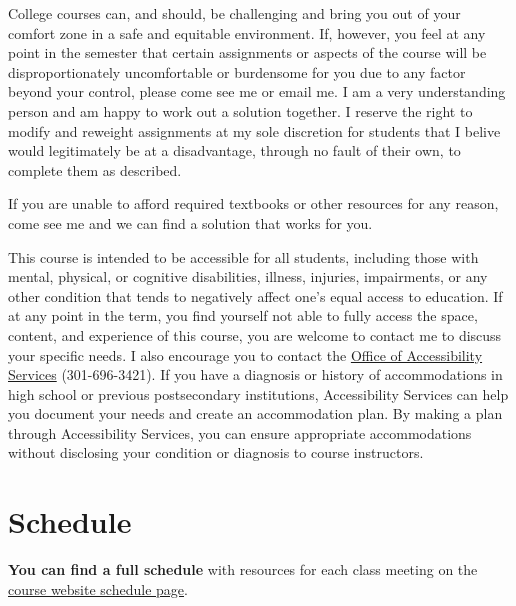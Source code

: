 \documentclass{article}
\begin{document}
College courses can, and should, be challenging and bring you out of
your comfort zone in a safe and equitable environment. If, however, you
feel at any point in the semester that certain assignments or aspects of
the course will be disproportionately uncomfortable or burdensome for
you due to any factor beyond your control, please come see me or email
me. I am a very understanding person and am happy to work out a solution
together. I reserve the right to modify and reweight assignments at my
sole discretion for students that I belive would legitimately be at a
disadvantage, through no fault of their own, to complete them as
described.

If you are unable to afford required textbooks or other resources for
any reason, come see me and we can find a solution that works for you.

This course is intended to be accessible for all students, including
those with mental, physical, or cognitive disabilities, illness,
injuries, impairments, or any other condition that tends to negatively
affect one's equal access to education. If at any point in the term, you
find yourself not able to fully access the space, content, and
experience of this course, you are welcome to contact me to discuss your
specific needs. I also encourage you to contact the
\href{https://www.hood.edu/academics/josephine-steiner-center-academic-achievement-retention/accessibility-services}{Office
of Accessibility Services} (301-696-3421). If you have a diagnosis or
history of accommodations in high school or previous postsecondary
institutions, Accessibility Services can help you document your needs
and create an accommodation plan. By making a plan through Accessibility
Services, you can ensure appropriate accommodations without disclosing
your condition or diagnosis to course instructors.

\hypertarget{schedule}{%
\section{Schedule}\label{schedule}}

\textbf{You can find a full schedule} with resources for each class
meeting on the
\href{http://ios20.classes.ryansafner.com/schedule/}{course website
schedule page}.
\end{document}
